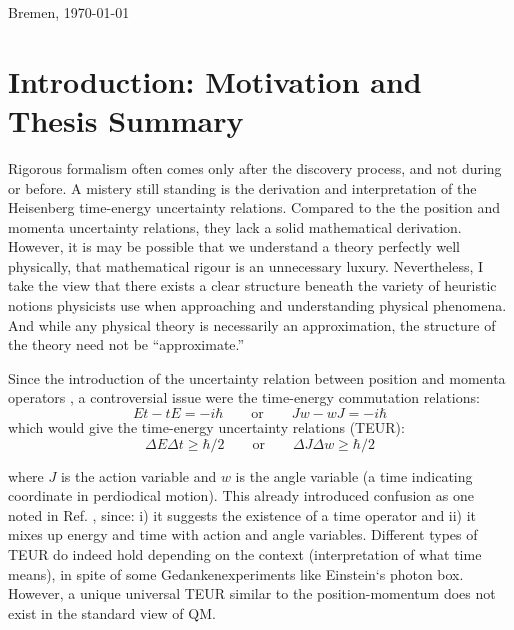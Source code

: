 \documentclass[a4paper,10pt]{article}
\numberwithin{equation}{section}
\begin{document}
\begin{titlepage}
 \vfill
\begin{center}
\normalsize{\large{Bremen, \today}}
\end{center}
\end{titlepage}




\newpage

\setcounter{tocdepth}{3}
\tableofcontents

\newpage
\justify

\setcounter{page}{1}

\section{Introduction: Motivation and Thesis Summary}

Rigorous formalism often comes only after the discovery process, and not during or before. A mistery still standing is the derivation and interpretation of the Heisenberg time-energy uncertainty relations. Compared to the the position and momenta uncertainty relations, they lack a solid mathematical derivation. However, it is may be possible that we understand a theory perfectly well physically, that mathematical rigour is an unnecessary luxury. Nevertheless, I take the view that there exists a clear structure beneath the variety of heuristic notions physicists use when approaching and understanding physical phenomena. And while any physical theory is necessarily an approximation, the structure of the theory need not be “approximate.”


Since the introduction of the uncertainty relation between position and momenta operators \cite{HeisenbergUR}, a controversial issue were the time-energy commutation relations:
\begin{equation}
    Et - tE = -i\hbar \qquad \text{or} \qquad  Jw - wJ = -i\hbar
\end{equation}
which would give the time-energy uncertainty relations (TEUR):
\begin{equation}
    \Delta E \Delta t \geq \hbar/2 \qquad \text{or} \qquad  \Delta J \Delta w \geq \hbar/2
\end{equation}


where $J$ is the action variable and $w$ is the angle variable (a time indicating coordinate in perdiodical motion). This already introduced confusion as one noted in Ref. \cite{BuschTEUR}, since: i) it suggests the existence of a time operator and ii) it mixes up energy and time with action and angle variables. Different types of TEUR do indeed hold depending on the context (interpretation of what time means), in spite of some Gedankenexperiments like Einstein`s photon box. However, a unique universal TEUR similar to the position-momentum does not exist in the standard view of QM.
\end{document}
